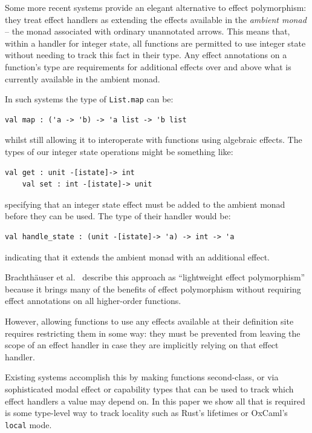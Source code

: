 \documentclass[acmsmall, screen, review, anonymous]{acmart}
\theoremstyle{definition}
\begin{document}
Some more recent systems \cite{brachthauser2020effects,
brachthauser2022effects, tang2025modal} provide an elegant
alternative to effect polymorphism: they treat effect handlers as
extending the effects available in the \emph{ambient monad} -- the monad
associated with ordinary unannotated arrows. This means that, within a
handler for integer state, all functions are permitted to use integer
state without needing to track this fact in their type. Any effect
annotations on a function's type are requirements for additional effects
over and above what is currently available in the ambient monad.

In such systems the type of \lstinline[style=oxcaml]{List.map} can be:
\begin{lstlisting}[style=oxcaml]
    val map : ('a -> 'b) -> 'a list -> 'b list
\end{lstlisting}
whilst still allowing it to interoperate with functions using algebraic
effects. The types of our integer state operations might be something like:
\begin{lstlisting}[style=oxcaml]
    val get : unit -[istate]-> int
    val set : int -[istate]-> unit
\end{lstlisting}
specifying that an integer state effect must be added to the ambient
monad before they can be used. The type of their handler would be:
\begin{lstlisting}[style=oxcaml]
    val handle_state : (unit -[istate]-> 'a) -> int -> 'a
\end{lstlisting}
indicating that it extends the ambient monad with an additional effect.

Brachth{\"a}user et al.~\cite{brachthauser2020effects} describe this
approach as ``lightweight effect polymorphism'' because it brings many
of the benefits of effect polymorphism without requiring effect
annotations on all higher-order functions.

However, allowing functions to use any effects available at their
definition site requires restricting them in some way: they must be
prevented from leaving the scope of an effect handler in case they are
implicitly relying on that effect handler.

Existing systems accomplish this by making functions second-class, or
via sophisticated modal effect or capability types that can be used to
track which effect handlers a value may depend on. In this paper we show
all that is required is some type-level way to track locality such as
Rust's lifetimes or OxCaml's \lstinline[style=oxcaml]{local} mode.
\end{document}
